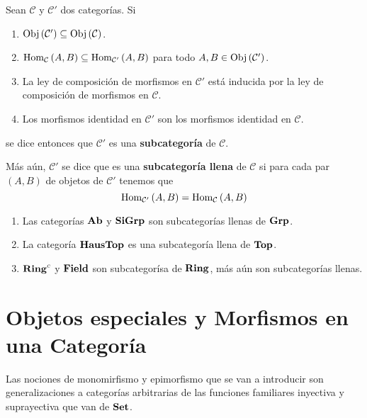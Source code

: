 \documentclass[12pt]{report}
\theoremstyle{largebreak}
\newcommand{\Obj}[1]{\ensuremath{\textup{Obj}\left(#1\right)}}
\newcommand{\Hom}[3]{\ensuremath{\textup{Hom}_{#1}\left(#2,#3\right)}}
\newcommand{\Cat}[1]{\ensuremath{\textup{\textbf{#1}}}}
\begin{document}
    \begin{mydef}
        Sean $\mathcal{C}$ y $\mathcal{C}'$ dos categorías. Si
        \begin{enumerate}
            \item $\Obj{\mathcal{C}'}\subseteq\Obj{\mathcal{C}}$.
            \item $\Hom{\mathcal{C}}{A}{B}\subseteq\Hom{\mathcal{C}'}{A}{B}$ para todo $A,B\in\Obj{\mathcal{C}'}$.
            \item La ley de composición de morfismos en $\mathcal{C}'$ está inducida por la ley de composición de morfismos en $\mathcal{C}$.
            \item Los morfismos identidad en $\mathcal{C}'$ son los morfismos identidad en $\mathcal{C}$.
        \end{enumerate}
        se dice entonces que $\mathcal{C}'$ es una \textbf{subcategoría} de $\mathcal{C}$.

        Más aún, $\mathcal{C}'$ se dice que es una \textbf{subcategoría llena} de $\mathcal{C}$ si para cada par $(A,B)$ de objetos de $\mathcal{C}'$ tenemos que
        \begin{equation*}
            \Hom{\mathcal{C}'}{A}{B}=\Hom{\mathcal{C}}{A}{B}
        \end{equation*}
    \end{mydef}

    \begin{exa}
        \begin{enumerate}
            Se cumple lo siguiente:
            \item Las categorías $\Cat{Ab}$ y $\Cat{SiGrp}$ son subcategorías llenas de $\Cat{Grp}$.
            \item La categoría $\Cat{HausTop}$ es una subcategoría llena de $\Cat{Top}$.
            \item $\Cat{Ring}^c$ y $\Cat{Field}$ son subcategorísa de $\Cat{Ring}$, más aún son subcategorías llenas.
        \end{enumerate}
    \end{exa}

    \section{Objetos especiales y Morfismos en una Categoría}

    Las nociones de monomirfismo y epimorfismo que se van a introducir son generalizaciones a categorías arbitrarias de las funciones familiares inyectiva y suprayectiva que van de $\Cat{Set}$.
\end{document}
